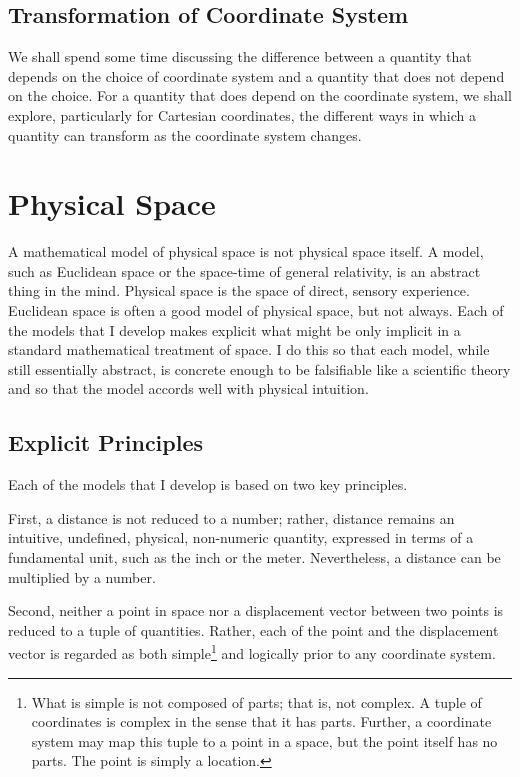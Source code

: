 \subsection{Transformation of Coordinate System}

We shall spend some time discussing the difference between a quantity that
depends on the choice of coordinate system and a quantity that does not depend
on the choice.  For a quantity that does depend on the coordinate system, we
shall explore, particularly for Cartesian coordinates, the different ways in
which a quantity can transform as the coordinate system changes.

\section{Physical Space}

A mathematical model of physical space is not physical space itself.  A model,
such as Euclidean space or the space-time of general relativity, is an abstract
thing in the mind.  Physical space is the space of direct, sensory experience.
Euclidean space is often a good model of physical space, but not always.  Each
of the models that I develop makes explicit what might be only implicit in a
standard mathematical treatment of space.  I do this so that each model, while
still essentially abstract, is concrete enough to be falsifiable like a
scientific theory and so that the model accords well with physical intuition.

\subsection{Explicit Principles}

Each of the models that I develop is based on two key principles.

First, a distance is not reduced to a number; rather, distance remains an
intuitive, undefined, physical, non-numeric quantity, expressed in terms of a
fundamental unit, such as the inch or the meter.  Nevertheless, a distance can
be multiplied by a number.

Second, neither a point in space nor a displacement vector between two points
is reduced to a tuple of quantities.  Rather, each of the point and the
displacement vector is regarded as both simple\footnote{%
   What is simple is not composed of parts; that is, not complex.  A tuple of
   coordinates is complex in the sense that it has parts.  Further, a
   coordinate system may map this tuple to a point in a space, but the point
   itself has no parts.  The point is simply a location.%
}
and logically prior to any coordinate system.

